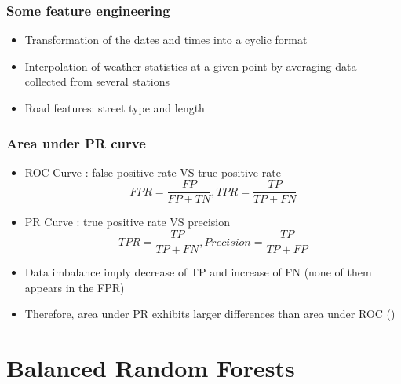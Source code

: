 \documentclass[slidestop,compress,red,mathserif]{beamer}
\begin{document}
\begin{frame}
	\frametitle{Some feature engineering}
	\begin{itemize}
		\item Transformation of the dates and times into a cyclic format
    \item Interpolation of weather statistics at a given point by averaging data collected from several stations
    \item Road features: street type and length
	\end{itemize}
\end{frame}

\begin{frame}
	\frametitle{Area under PR curve}
	\begin{itemize}
    \item ROC Curve : false positive rate VS true positive rate
    \begin{equation*}
			FPR = \frac{FP}{FP+TN},  TPR = \frac{TP}{TP+FN}
		\end{equation*}
		\item PR Curve : true positive rate VS precision
    \begin{equation*}
			TPR = \frac{TP}{TP+FN},  Precision = \frac{TP}{TP+FP}
		\end{equation*}
    \item Data imbalance imply decrease of TP and increase of FN (none of them appears in the FPR)
    \item Therefore, area under PR exhibits larger differences than area under ROC (\cite{Davis2006})
	\end{itemize}
\end{frame}


\section{Balanced Random Forests}
\end{document}
